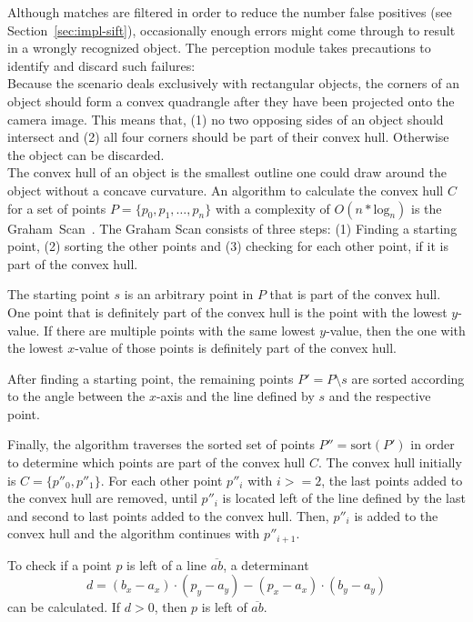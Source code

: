 Although matches are filtered in order to reduce the number false positives (see Section~\ref{sec:impl-sift}), occasionally enough errors might come through to result in a wrongly recognized object. The perception module takes precautions to identify and discard such failures: \\

Because the scenario deals exclusively with rectangular objects, the corners of an object should form a convex quadrangle after they have been projected onto the camera image. This means that, (1) no two opposing sides of an object should intersect and (2) all four corners should be part of their convex hull. Otherwise the object can be discarded. \\

The convex hull of an object is the smallest outline one could draw around the object without a concave curvature. An algorithm to calculate the convex hull $C$ for a set of points $P = \{p_0, p_1, \dots, p_n\}$ with a complexity of $O(n * \text{log}_n)$ is the Graham~Scan~\cite{graham_scan}. The Graham Scan consists of three steps: (1) Finding a starting point, (2) sorting the other points and (3) checking for each other point, if it is part of the convex hull.

The starting point $s$ is an arbitrary point in $P$ that is part of the convex hull. One point that is definitely part of the convex hull is the point with the lowest $y$-value. If there are multiple points with the same lowest $y$-value, then the one with the lowest $x$-value of those points is definitely part of the convex hull.

After finding a starting point, the remaining points $P' = P \setminus s$ are sorted according to the angle between the $x$-axis and the line defined by $s$ and the respective point.

Finally, the algorithm traverses the sorted set of points $P'' = \text{sort}(P')$ in order to determine which points are part of the convex hull $C$. The convex hull initially is $C = \{p''_0, p''_1\}$. For each other point $p''_i$ with $i >= 2$, the last points added to the convex hull are removed, until $p''_i$ is located left of the line defined by the last and second to last points added to the convex hull. Then, $p''_i$ is added to the convex hull and the algorithm continues with $p''_{i+1}$.

To check if a point $p$ is left of a line $\overline{a b}$, a determinant
\begin{equation*}
  d = (b_x - a_x) \cdot (p_y - a_y) - (p_x - a_x) \cdot (b_y - a_y)
\end{equation*}
can be calculated. If $d > 0$, then $p$ is left of $\overline{a b}$.\\

